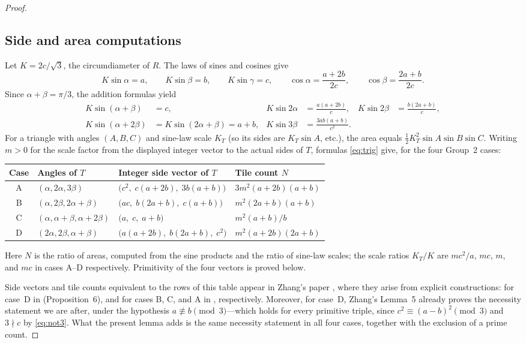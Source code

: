 \documentclass[11pt]{amsart}
\theoremstyle{remark}
\begin{document}
\begin{proof}
\subsection*{Side and area computations}
Let $K=2c/\sqrt 3$, the circumdiameter of $R$. The laws of sines and cosines give
\[
K\sin\alpha=a,\qquad K\sin\beta=b,\qquad K\sin\gamma=c,\qquad
\cos\alpha=\frac{a+2b}{2c},\qquad \cos\beta=\frac{2a+b}{2c}.
\]
Since $\alpha+\beta=\pi/3$, the addition formulas yield
\begin{equation}\label{eq:trig}
\begin{aligned}
K\sin(\alpha+\beta)&=c, &
K\sin 2\alpha&=\frac{a(a+2b)}{c}, &
K\sin 2\beta&=\frac{b(2a+b)}{c},\\
K\sin(\alpha+2\beta)&=K\sin(2\alpha+\beta)=a+b, &
K\sin 3\beta&=\frac{3ab(a+b)}{c^{2}}. &&
\end{aligned}
\end{equation}
For a triangle with angles $(A,B,C)$ and sine-law scale $K_T$ (so its sides are $K_T\sin A$, etc.), the area equals $\tfrac{1}{2}K_T^{2}\sin A\sin B\sin C$. Writing $m>0$ for the scale factor from the displayed integer vector to the actual sides of $T$, formulas \eqref{eq:trig} give, for the four Group~2 cases:

\begin{center}
\begin{tabular}{@{}clll@{}}
\toprule
Case & Angles of $T$ & Integer side vector of $T$ & Tile count $N$ \\
\midrule
A & $(\alpha,2\alpha,3\beta)$ & $\bigl(c^2,\;c(a+2b),\;3b(a+b)\bigr)$ & $3m^2(a+2b)(a+b)$ \\
B & $(\alpha,2\beta,2\alpha+\beta)$ & $\bigl(ac,\;b(2a+b),\;c(a+b)\bigr)$ & $m^2(2a+b)(a+b)$ \\
C & $(\alpha,\alpha+\beta,\alpha+2\beta)$ & $\bigl(a,\;c,\;a+b\bigr)$ & $m^2(a+b)/b$ \\
D & $(2\alpha,2\beta,\alpha+\beta)$ & $\bigl(a(a+2b),\;b(2a+b),\;c^2\bigr)$ & $m^2(a+2b)(2a+b)$ \\
\bottomrule
\end{tabular}
\end{center}

\smallskip
Here $N$ is the ratio of areas, computed from the sine products and the ratio of sine-law scales; the scale ratios $K_T/K$ are $mc^2/a$, $mc$, $m$, and $mc$ in cases A--D respectively. Primitivity of the four vectors is proved below.

Side vectors and tile counts equivalent to the rows of this table appear in Zhang's paper \cite{Zhang25}, where they arise from explicit constructions: for case~D in \cite[Section~4]{Zhang25} (Proposition~6), and for cases B, C, and A in \cite[Propositions~10, 9, and~11]{Zhang25}, respectively. Moreover, for case~D, Zhang's Lemma~5 already proves the necessity statement we are after, under the hypothesis $a\not\equiv b\pmod 3$---which holds for every primitive triple, since $c^2\equiv(a-b)^2\pmod 3$ and $3\nmid c$ by \eqref{eq:not3}. What the present lemma adds is the same necessity statement in all four cases, together with the exclusion of a prime count.


\end{proof}
\end{document}
